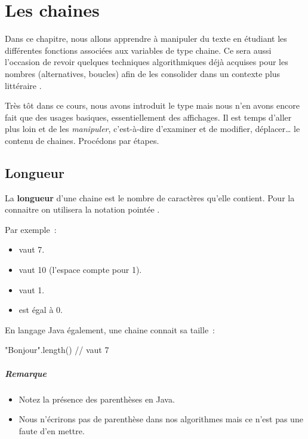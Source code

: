 \chapter{Les chaines}

	Dans ce chapitre, nous allons apprendre à manipuler du texte en étudiant les
	différentes fonctions associées aux variables de type chaine.  Ce sera aussi
	l’occasion de revoir quelques techniques algorithmiques déjà acquises pour
	les nombres (alternatives, boucles) afin de les consolider dans un contexte
	plus \og littéraire \fg.

	
	Très tôt dans ce cours, nous avons introduit le type  mais nous
	n’en avons encore fait que des usages basiques, essentiellement des
	affichages.  Il est temps d’aller plus loin et de les \emph{manipuler},
	c’est-à-dire d’examiner et de modifier, déplacer… le contenu de chaines.
	Procédons par étapes.
	
	\minitoc

	\clearpage
\section{Longueur}
	
	 La \textbf{longueur}
	d’une chaine est le nombre de caractères qu’elle contient.  Pour la
	connaitre on utilisera la notation pointée .
	
	Par exemple~:

	\begin{itemize}
	\item {} vaut 7.
	\item {} vaut 10 (l’espace compte pour 1).
	\item {} vaut 1.
	\item {} est égal à 0.
	\end{itemize}

	En langage Java également, une chaine connait sa taille~:

	\begin{java}
"Bonjour".length() // vaut 7		
	\end{java}

	\paragraph{Remarque}
	\begin{itemize}
		\item Notez la présence des parenthèses en Java. 
		
		\item Nous n'écrirons pas de parenthèse dans nos algorithmes mais ce
			n'est pas une faute d'en mettre. 
	
	\end{itemize}

